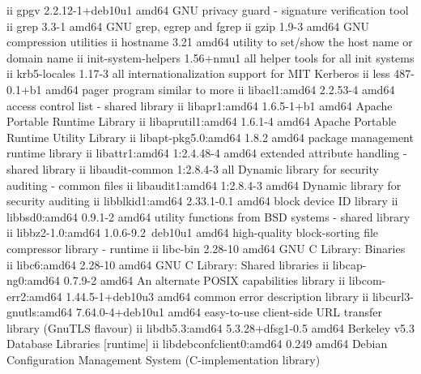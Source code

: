 ii  gpgv                       2.2.12-1+deb10u1            amd64        GNU privacy guard - signature verification tool
ii  grep                       3.3-1                       amd64        GNU grep, egrep and fgrep
ii  gzip                       1.9-3                       amd64        GNU compression utilities
ii  hostname                   3.21                        amd64        utility to set/show the host name or domain name
ii  init-system-helpers        1.56+nmu1                   all          helper tools for all init systems
ii  krb5-locales               1.17-3                      all          internationalization support for MIT Kerberos
ii  less                       487-0.1+b1                  amd64        pager program similar to more
ii  libacl1:amd64              2.2.53-4                    amd64        access control list - shared library
ii  libapr1:amd64              1.6.5-1+b1                  amd64        Apache Portable Runtime Library
ii  libaprutil1:amd64          1.6.1-4                     amd64        Apache Portable Runtime Utility Library
ii  libapt-pkg5.0:amd64        1.8.2                       amd64        package management runtime library
ii  libattr1:amd64             1:2.4.48-4                  amd64        extended attribute handling - shared library
ii  libaudit-common            1:2.8.4-3                   all          Dynamic library for security auditing - common files
ii  libaudit1:amd64            1:2.8.4-3                   amd64        Dynamic library for security auditing
ii  libblkid1:amd64            2.33.1-0.1                  amd64        block device ID library
ii  libbsd0:amd64              0.9.1-2                     amd64        utility functions from BSD systems - shared library
ii  libbz2-1.0:amd64           1.0.6-9.2~deb10u1           amd64        high-quality block-sorting file compressor library - runtime
ii  libc-bin                   2.28-10                     amd64        GNU C Library: Binaries
ii  libc6:amd64                2.28-10                     amd64        GNU C Library: Shared libraries
ii  libcap-ng0:amd64           0.7.9-2                     amd64        An alternate POSIX capabilities library
ii  libcom-err2:amd64          1.44.5-1+deb10u3            amd64        common error description library
ii  libcurl3-gnutls:amd64      7.64.0-4+deb10u1            amd64        easy-to-use client-side URL transfer library (GnuTLS flavour)
ii  libdb5.3:amd64             5.3.28+dfsg1-0.5            amd64        Berkeley v5.3 Database Libraries [runtime]
ii  libdebconfclient0:amd64    0.249                       amd64        Debian Configuration Management System (C-implementation library)
